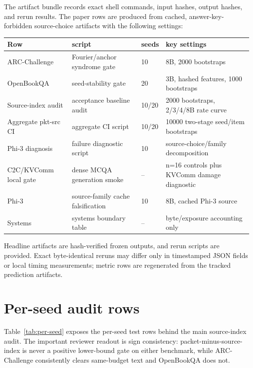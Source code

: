 \documentclass{article}
\newcommand{\arc}{ARC-Challenge}
\newcommand{\obqa}{OpenBookQA}
\begin{document}
The artifact bundle records exact shell commands, input hashes, output hashes,
and rerun results. The paper rows are produced from cached,
answer-key-forbidden source-choice artifacts with the following settings:

\begin{center}
\scriptsize
\begin{tabular}{llll}
\toprule
Row & script & seeds & key settings \\
\midrule
\arc{} & Fourier/anchor syndrome gate & 10 & 8B, 2000 bootstraps \\
\obqa{} & seed-stability gate & 20 & 3B, hashed features, 1000 bootstraps \\
Source-index audit & acceptance baseline audit & 10/20 & 2000 bootstraps, 2/3/4/8B rate curve \\
Aggregate pkt-src CI & aggregate CI script & 10/20 & 10000 two-stage seed/item bootstraps \\
Phi-3 diagnosis & failure diagnostic script & 10 & source-choice/family decomposition \\
C2C/KVComm local gate & dense MCQA generation smoke & -- & n=16 controls plus KVComm damage diagnostic \\
Phi-3 & source-family cache falsification & 10 & 8B, cached Phi-3 source \\
Systems & systems boundary table & -- & byte/exposure accounting only \\
\bottomrule
\end{tabular}
\end{center}

Headline artifacts are hash-verified frozen outputs, and rerun scripts are
provided. Exact byte-identical reruns may differ only in timestamped JSON fields
or local timing measurements; metric rows are regenerated from the tracked
prediction artifacts.

\section{Per-seed audit rows}

Table~\ref{tab:per-seed} exposes the per-seed test rows behind the main source-index audit. The important reviewer readout is sign consistency: packet-minus-source-index is never a positive lower-bound gate on either benchmark, while \arc{} consistently clears same-budget text and \obqa{} does not.
\end{document}
